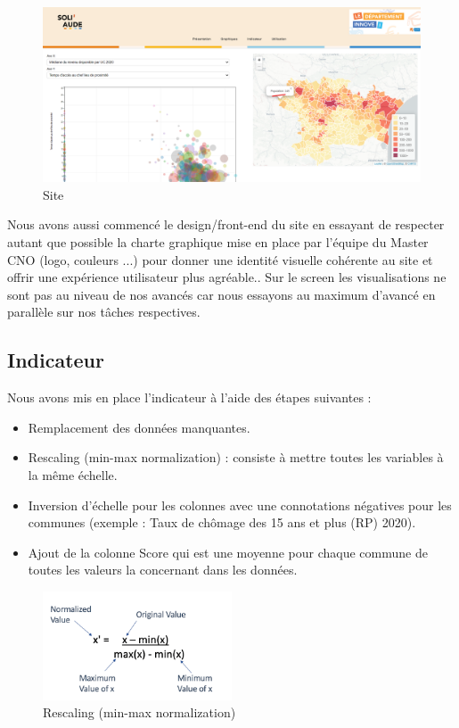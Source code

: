 \documentclass{article}
\begin{document}
\begin{figure}[h]
    \centering
    \includegraphics[width=1\textwidth]{mathis_site.png}
    \caption{Site}
    \label{fig:Site}
\end{figure}

Nous avons aussi commencé le design/front-end du site en essayant de respecter autant que possible la charte graphique mise en place par l'équipe du Master CNO (logo, couleurs ...) pour donner une identité visuelle cohérente au site et offrir une expérience utilisateur plus agréable.. Sur le screen les visualisations ne sont pas au niveau de nos avancés car nous essayons au maximum d'avancé en parallèle sur nos tâches respectives. 

\subsection{Indicateur}

Nous avons mis en place l'indicateur à l'aide des étapes suivantes : \\

\begin{itemize}
    \item Remplacement des données manquantes.
    \item Rescaling (min-max normalization) : consiste à mettre toutes les variables à la même échelle.
    \item Inversion d'échelle pour les colonnes avec une connotations négatives pour les communes (exemple : Taux de chômage des 15 ans et plus (RP) 2020).
    \item Ajout de la colonne Score qui est une moyenne pour chaque commune de toutes les valeurs la concernant dans les données. \\
\end{itemize} 

\begin{figure}[h]
    \centering
    \includegraphics[width=0.5\textwidth]{normalisation.png}
    \caption{Rescaling (min-max normalization)}
    \label{fig:Rescaling (min-max normalization)}
\end{figure}
\vspace{2cm}
\end{document}
